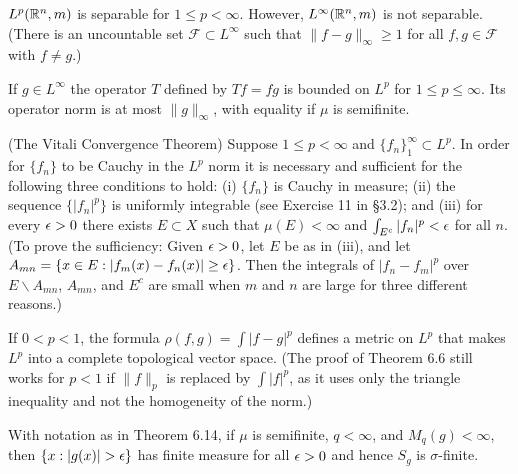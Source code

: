 \documentclass[12pt, a4paper]{article}
\begin{document}
\begin{problem}\label{prob:6-13}
$L^{p}(\mathbb{R}^{n},m)$ is separable for $1\le p<\infty$. However, $L^{\infty}(\mathbb{R}^{n},m)$ is not separable. (There is an uncountable set $\mathcal{F}\subset L^{\infty}$ such that $\|f-g\|_{\infty}\ge1$ for all $f,g\in\mathcal{F}$ with $f\ne g$.)
\end{problem}

\begin{problem}\label{prob:6-14}
If $g\in L^{\infty}$ the operator $T$ defined by $Tf=fg$ is bounded on $L^{p}$ for $1\le p\le\infty.$ Its operator norm is at most $\|g\|_{\infty}$, with equality if $\mu$ is semifinite.
\end{problem}

\begin{problem}\label{prob:6-15}
(The Vitali Convergence Theorem) Suppose $1\le p<\infty$ and $\{f_{n}\}_{1}^{\infty}\subset L^{p}$. In order for $\{f_{n}\}$ to be Cauchy in the $L^{p}$ norm it is necessary and sufficient for the following three conditions to hold: (i) $\{f_{n}\}$ is Cauchy in measure; (ii) the sequence $\{|f_{n}|^{p}\}$ is uniformly integrable (see Exercise 11 in \S 3.2); and (iii) for every $\epsilon>0$ there exists $E\subset X$ such that $\mu(E)<\infty$ and $\int_{E^{c}}|f_{n}|^{p}<\epsilon$ for all $n$. (To prove the sufficiency: Given $\epsilon>0$, let $E$ be as in (iii), and let $A_{mn}=\{x\in E: |f_{m}(x)-f_{n}(x)|\ge\epsilon\}$. Then the integrals of $|f_{n}-f_{m}|^{p}$ over $E\backslash A_{mn}$, $A_{mn}$, and $E^{c}$ are small when $m$ and $n$ are large for three different reasons.)
\end{problem}

\begin{problem}\label{prob:6-16}
If $0<p<1$, the formula $\rho(f,g)=\int|f-g|^{p}$ defines a metric on $L^{p}$ that makes $L^{p}$ into a complete topological vector space. (The proof of Theorem 6.6 still works for $p<1$ if $\|f\|_{p}$ is replaced by $\int|f|^{p}$, as it uses only the triangle inequality and not the homogeneity of the norm.)
\end{problem}

\begin{problem}\label{prob:6-17}
With notation as in Theorem 6.14, if $\mu$ is semifinite, $q<\infty$, and $M_{q}(g)<\infty$, then $\{x:|g(x)|>\ep\}$ has finite measure for all $\epsilon>0$ and hence $S_{g}$ is $\sigma$-finite.
\end{problem}
\end{document}
